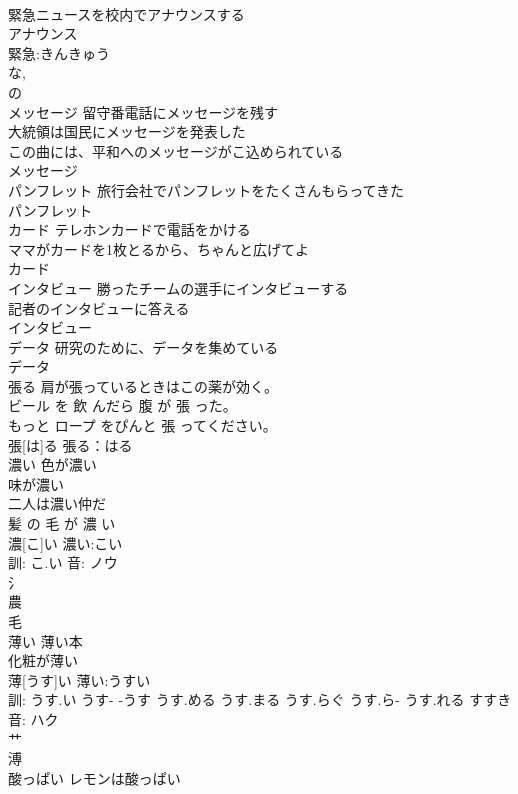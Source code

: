 \documentclass[8pt]{extreport}
\begin{document}
\begin{CJK}{UTF8}{min}
\\	緊急ニュースを校内でアナウンスする 
\\	アナウンス			
\\	緊急:きんきゅう
\\	な, 
\\	の 
\\	メッセージ	留守番電話にメッセージを残す 
\\	大統領は国民にメッセージを発表した 
\\	この曲には、平和へのメッセージがこ込められている 
\\	メッセージ			
\\	パンフレット	旅行会社でパンフレットをたくさんもらってきた 
\\	パンフレット			
\\	カード	テレホンカードで電話をかける 
\\	ママがカードを1枚とるから、ちゃんと広げてよ 
\\	カード						
\\	インタビュー	勝ったチームの選手にインタビューする 
\\	記者のインタビューに答える 
\\	インタビュー						
\\	データ	研究のために、データを集めている 
\\	データ						
\\	張る	肩が張っているときはこの薬が効く。 
\\	ビール を 飲 んだら 腹 が 張 った。 
\\	もっと ロープ をぴんと 張 ってください。 
\\	張[は]る			張る：はる
\\	濃い	色が濃い 
\\	味が濃い 
\\	二人は濃い仲だ 
\\	髪 の 毛 が 濃 い 
\\	濃[こ]い			濃い:こい
\\	訓: こ.い 音: ノウ 
\\	氵 
\\	農 
\\	毛 
\\	薄い	薄い本 
\\	化粧が薄い 
\\	薄[うす]い			薄い:うすい
\\	訓: うす.い うす- -うす うす.める うす.まる うす.らぐ うす.ら- うす.れる すすき 音: ハク 
\\	艹 
\\	溥 
\\	酸っぱい	レモンは酸っぱい 

\end{CJK}
\end{document}
